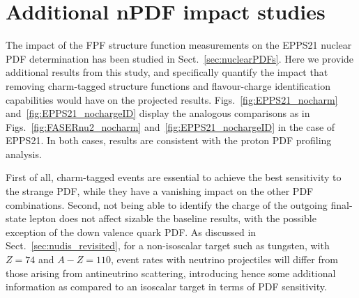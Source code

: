 \clearpage
\section{Additional nPDF impact studies}
\label{app:nPDF_impact_appendix}

The impact of the FPF structure function measurements on the
EPPS21 nuclear PDF determination has been studied in Sect.~\ref{sec:nuclearPDFs}.
%
Here we provide additional results from this study, and specifically quantify the impact
that removing charm-tagged structure functions and flavour-charge
identification capabilities would have on the projected results.
%
Figs.~\ref{fig:EPPS21_nocharm} and~\ref{fig:EPPS21_nochargeID} display
the analogous comparisons as in Figs.~\ref{fig:FASERnu2_nocharm}
and~\ref{fig:EPPS21_nochargeID} in the case of EPPS21.
%
In both cases, results are consistent with the proton PDF profiling analysis.

First of all, charm-tagged events are essential to achieve the best
sensitivity to the strange PDF, while they have a vanishing impact on the
other PDF combinations.
%
Second, not being able to identify the charge of the outgoing final-state lepton
does not affect sizable the baseline results, with the possible exception
of the down valence quark PDF.
%
As discussed in Sect.~\ref{sec:nudis_revisited}, for a non-isoscalar target
such as tungsten, with $Z=74$ and $A-Z=110$, event rates with neutrino projectiles
will differ from those arising from antineutrino scattering, introducing
hence some additional information as compared to an isoscalar target in terms
of PDF sensitivity.

